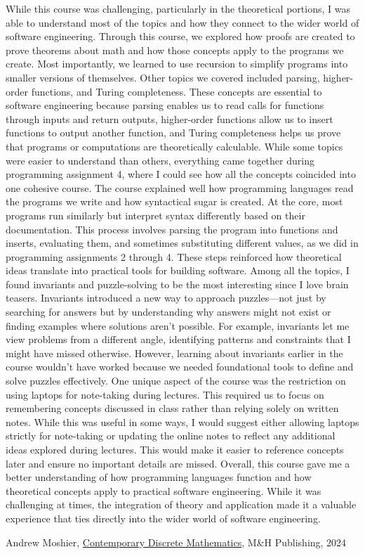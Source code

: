 \documentclass{article}
\theoremstyle{theorem}
\theoremstyle{definition}
\theoremstyle{remark}
\begin{document}
While this course was challenging, particularly in the theoretical portions, I was able to understand 
most of the topics and how they connect to the wider world of software engineering. Through this 
course, we explored how proofs are created to prove theorems about math and how those concepts apply 
to the programs we create. Most importantly, we learned to use recursion to simplify programs into 
smaller versions of themselves. Other topics we covered included parsing, higher-order functions, and 
Turing completeness. These concepts are essential to software engineering because parsing enables us 
to read calls for functions through inputs and return outputs, higher-order functions allow us to 
insert functions to output another function, and Turing completeness helps us prove that programs or 
computations are theoretically calculable. While some topics were easier to understand than others, 
everything came together during programming assignment 4, where I could see how all the concepts 
coincided into one cohesive course. The course explained well how programming languages read the 
programs we write and how syntactical sugar is created. At the core, most programs run similarly 
but interpret syntax differently based on their documentation. This process involves parsing the 
program into functions and inserts, evaluating them, and sometimes substituting different values, 
as we did in programming assignments 2 through 4. These steps reinforced how theoretical ideas 
translate into practical tools for building software. Among all the topics, I found invariants and 
puzzle-solving to be the most interesting since I love brain teasers. Invariants introduced a new way 
to approach puzzles—not just by searching for answers but by understanding why answers might not exist or 
finding examples where solutions aren't possible. For example, invariants let me view problems from a different 
angle, identifying patterns and constraints that I might have missed otherwise. However, learning about invariants 
earlier in the course wouldn’t have worked because we needed foundational tools to define and solve puzzles effectively. 
One unique aspect of the course was the restriction on using laptops for note-taking during lectures. This 
required us to focus on remembering concepts discussed in class rather than relying solely on written notes. 
While this was useful in some ways, I would suggest either allowing laptops strictly for note-taking or updating 
the online notes to reflect any additional ideas explored during lectures. This would make it easier to reference 
concepts later and ensure no important details are missed. Overall, this course gave me a better understanding of 
how programming languages function and how theoretical concepts apply to practical software engineering. While it 
was challenging at times, the integration of theory and application made it a valuable experience that ties 
directly into the wider world of software engineering.

\begin{thebibliography}{99}
 Andrew Moshier, \href{https://canvas.chapman.edu/courses/66029/files/6581500?module_item_id=2280521}{Contemporary Discrete Mathematics}, M\&H Publishing, 2024
\end{thebibliography}
\end{document}
